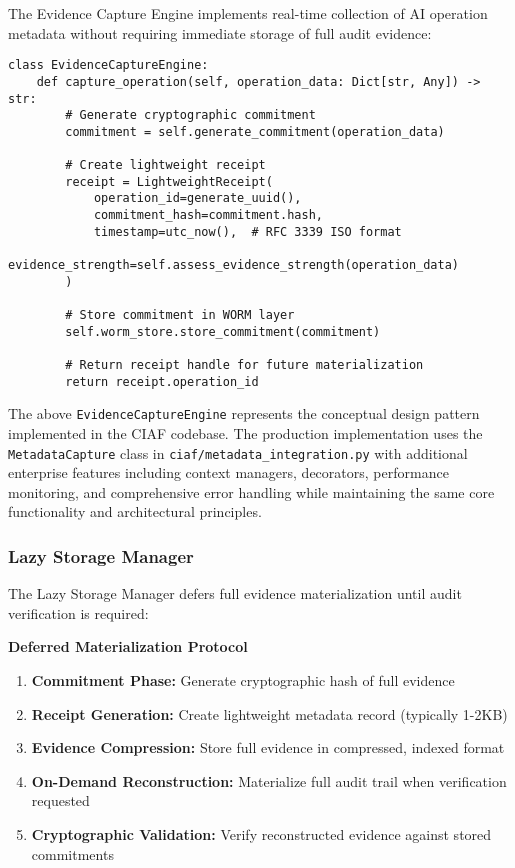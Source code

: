 \documentclass[12pt,a4paper]{article}
\begin{document}
The Evidence Capture Engine implements real-time collection of AI operation metadata without requiring immediate storage of full audit evidence:

\begin{lstlisting}[caption=Evidence Capture Core Algorithm]
class EvidenceCaptureEngine:
    def capture_operation(self, operation_data: Dict[str, Any]) -> str:
        # Generate cryptographic commitment
        commitment = self.generate_commitment(operation_data)
        
        # Create lightweight receipt
        receipt = LightweightReceipt(
            operation_id=generate_uuid(),
            commitment_hash=commitment.hash,
            timestamp=utc_now(),  # RFC 3339 ISO format
            evidence_strength=self.assess_evidence_strength(operation_data)
        )
        
        # Store commitment in WORM layer
        self.worm_store.store_commitment(commitment)
        
        # Return receipt handle for future materialization
        return receipt.operation_id
\end{lstlisting}

\begin{tcolorbox}[colframe=blue!70, colback=green!8, title={\textbf{Implementation Note}}]
The above \texttt{EvidenceCaptureEngine} represents the conceptual design pattern implemented in the CIAF codebase. The production implementation uses the \texttt{MetadataCapture} class in \texttt{ciaf/metadata\_integration.py} with additional enterprise features including context managers, decorators, performance monitoring, and comprehensive error handling while maintaining the same core functionality and architectural principles.
\end{tcolorbox}

\subsubsection{Lazy Storage Manager}

The Lazy Storage Manager defers full evidence materialization until audit verification is required:

\begin{technicalbox}
\textbf{Deferred Materialization Protocol}
\begin{enumerate}
\item \textbf{Commitment Phase:} Generate cryptographic hash of full evidence
\item \textbf{Receipt Generation:} Create lightweight metadata record (typically 1-2KB)
\item \textbf{Evidence Compression:} Store full evidence in compressed, indexed format
\item \textbf{On-Demand Reconstruction:} Materialize full audit trail when verification requested
\item \textbf{Cryptographic Validation:} Verify reconstructed evidence against stored commitments
\end{enumerate}
\end{technicalbox}
\end{document}
